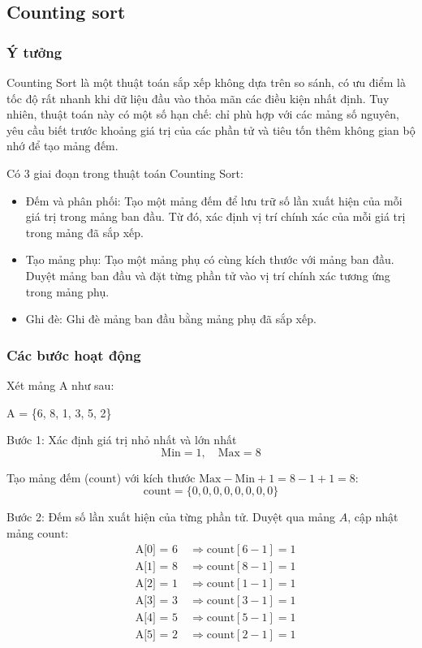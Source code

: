 \subsection{Counting sort}

\subsubsection{Ý tưởng}
Counting Sort là một thuật toán sắp xếp không dựa trên so sánh, có ưu điểm là tốc độ rất nhanh khi dữ liệu đầu vào thỏa mãn các điều kiện nhất định. Tuy nhiên, thuật toán này có một số hạn chế: chỉ phù hợp với các mảng số nguyên, yêu cầu biết trước khoảng giá trị của các phần tử và tiêu tốn thêm không gian bộ nhớ để tạo mảng đếm.

Có 3 giai đoạn trong thuật toán Counting Sort:
\begin{itemize}
    \item Đếm và phân phối: Tạo một mảng đếm để lưu trữ số lần xuất hiện của mỗi giá trị trong mảng ban đầu. Từ đó, xác định vị trí chính xác của mỗi giá trị trong mảng đã sắp xếp.
    \item Tạo mảng phụ: Tạo một mảng phụ có cùng kích thước với mảng ban đầu. Duyệt mảng ban đầu và đặt từng phần tử vào vị trí chính xác tương ứng trong mảng phụ.
    \item Ghi đè: Ghi đè mảng ban đầu bằng mảng phụ đã sắp xếp.
\end{itemize}


\subsubsection{Các bước hoạt động}
Xét mảng A như sau: 
\begin{center}
   A = \{6, 8, 1, 3, 5, 2\} 
\end{center} 

Bước 1: Xác định giá trị nhỏ nhất và lớn nhất
\[
\text{Min} = 1, \quad \text{Max} = 8
\]

Tạo mảng đếm (\( \text{count} \)) với kích thước \( \text{Max} - \text{Min} + 1 = 8 - 1 + 1 = 8 \):
\[
\text{count} = \{0, 0, 0, 0, 0, 0, 0, 0\}
\]

Bước 2: Đếm số lần xuất hiện của từng phần tử. Duyệt qua mảng \( A \), cập nhật mảng \( \text{count} \):
\[
\begin{aligned}
&\text{A[0] = 6} \quad \Rightarrow \text{count}[6 - 1] = 1 \\
&\text{A[1] = 8} \quad \Rightarrow \text{count}[8 - 1] = 1 \\
&\text{A[2] = 1} \quad \Rightarrow \text{count}[1 - 1] = 1 \\
&\text{A[3] = 3} \quad \Rightarrow \text{count}[3 - 1] = 1 \\
&\text{A[4] = 5} \quad \Rightarrow \text{count}[5 - 1] = 1 \\
&\text{A[5] = 2} \quad \Rightarrow \text{count}[2 - 1] = 1 \\
\end{aligned}
\]

